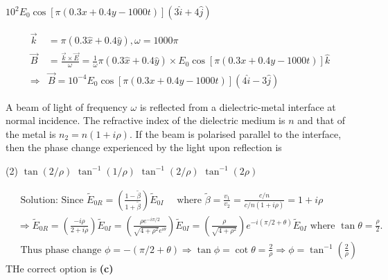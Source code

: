 \begin{enumerate}
\begin{tasks}
	\task[\textbf{D.}]$10^{2} E_{0} \cos [\pi(0.3 x+0.4 y-1000 t)](3 \hat{i}+4 \hat{j})$
\end{tasks}
\begin{answer}
	$$ \begin{aligned}
	\vec{k} &=\pi(0.3 \hat{x}+0.4 \hat{y}), \omega=1000 \pi \\
	\vec{B} &=\frac{\vec{k} \times \vec{E}}{\omega}=\frac{1}{\omega} \pi(0.3 \hat{x}+0.4 \hat{y}) \times E_{0} \cos [\pi(0.3 x+0.4 y-1000 t)] \hat{k} \\
	\Rightarrow & \vec{B}=10^{-4} E_{0} \cos [\pi(0.3 x+0.4 y-1000 t)](4 \hat{i}-3 \hat{j})
	\end{aligned}$$	
\end{answer}
\begin{minipage}{\textwidth}
	\item A beam of light of frequency $\omega$ is reflected from a dielectric-metal interface at normal incidence. The refractive index of the dielectric medium is $n$ and that of the metal is $n_{2}=n(1+i \rho)$. If the beam is polarised parallel to the interface, then the phase change experienced by the light upon reflection is
\end{minipage}
\begin{tasks}(2)
	\task[\textbf{A.}] $\tan (2 / \rho)$ 
	\task[\textbf{B.}]$\tan ^{-1}(1 / \rho)$
	\task[\textbf{C.}]$\tan ^{-1}(2 / \rho)$
	\task[\textbf{D.}]$\tan ^{-1}(2 \rho)$
\end{tasks}
\begin{answer}
	$$\begin{aligned}
	&\text { Solution: Since } \tilde{E}_{0 R}=\left(\frac{1-\tilde{\beta}}{1+\tilde{\beta}}\right) \tilde{E}_{0 I} \quad \text { where } \tilde{\beta}=\frac{v_{1}}{v_{2}}=\frac{c / n}{c / n(1+i \rho)}=1+i \rho \\
	&\Rightarrow \tilde{E}_{0 R}=\left(\frac{-i \rho}{2+i \rho}\right) \tilde{E}_{0 I}=\left(\frac{\rho e^{-i \pi / 2}}{\sqrt{4+\rho^{2}} e^{i \theta}}\right) \tilde{E}_{0 I}=\left(\frac{\rho}{\sqrt{4+\rho^{2}}}\right) e^{-i(\pi / 2+\theta)} \tilde{E}_{0 I} \text { where } \tan \theta=\frac{\rho}{2} . \\
	&\text { Thus phase change } \phi=-(\pi / 2+\theta) \Rightarrow \tan \phi=\cot \theta=\frac{2}{\rho} \Rightarrow \phi=\tan ^{-1}\left(\frac{2}{\rho}\right)
	\end{aligned}$$
	THe correct option is \textbf{(c)}
\end{answer}
\begin{minipage}{\textwidth}

\end{minipage}
\end{enumerate}
